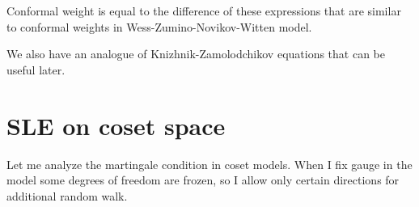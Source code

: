\documentclass[a4paper]{article}
\begin{document}
Conformal weight is equal to the difference of these expressions that are similar to conformal
weights in Wess-Zumino-Novikov-Witten model. 

We also have an analogue of Knizhnik-Zamolodchikov equations that can be useful later. 

\section{SLE on coset space}
\label{sec:sle-coset-space}

Let me analyze the martingale condition in coset models. When I fix gauge in the model some degrees
of freedom are frozen, so I allow only certain directions for additional random walk. 
\end{document}
